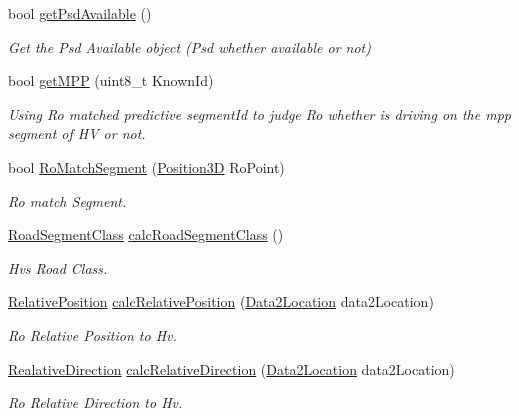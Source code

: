 \begin{DoxyCompactItemize}
bool \hyperlink{class_psd_location_aef776415f675a76e9b4c100534ba8ac5}{get\+Psd\+Available} ()
\begin{DoxyCompactList}\small\item\em Get the Psd Available object (Psd whether available or not) \end{DoxyCompactList}\item 
bool \hyperlink{class_psd_location_a07faf8dd338c17fb33e5978b90938c22}{get\+M\+PP} (uint8\+\_\+t Known\+Id)
\begin{DoxyCompactList}\small\item\em Using Ro matched predictive segment\+Id to judge Ro whether is driving on the mpp segment of HV or not. \end{DoxyCompactList}\item 
bool \hyperlink{class_psd_location_a8ff8c5e7cf8057f083f0a1d05fe49d56}{Ro\+Match\+Segment} (\hyperlink{_geometric_calc_8h_aabfa1dd0400b274a48b4a45afbee0af4}{Position3D} Ro\+Point)
\begin{DoxyCompactList}\small\item\em Ro match Segment. \end{DoxyCompactList}\item 
\hyperlink{_psd_message_decoder_8h_a4f9adeb93dfc3dac7961fa97e890b1a5}{Road\+Segment\+Class} \hyperlink{class_psd_location_a49111bfc564db23a9c64612d285ff4bc}{calc\+Road\+Segment\+Class} ()
\begin{DoxyCompactList}\small\item\em Hv\textquotesingle{}s Road Class. \end{DoxyCompactList}\item 
\hyperlink{_psd_location_8h_abcb85fd51379afdf750bdda1dec9174c}{Relative\+Position} \hyperlink{class_psd_location_a3b1402df4271f1470603a82a4fe03b68}{calc\+Relative\+Position} (\hyperlink{_psd_location_8h_a1e3a92020005d2a81aa50ba5ae9b129c}{Data2\+Location} data2\+Location)
\begin{DoxyCompactList}\small\item\em Ro Relative Position to Hv. \end{DoxyCompactList}\item 
\hyperlink{_psd_location_8h_ae65d9d286580719610837075ffad7232}{Realative\+Direction} \hyperlink{class_psd_location_afb451818c3fd9ff5e260270365bf165f}{calc\+Relative\+Direction} (\hyperlink{_psd_location_8h_a1e3a92020005d2a81aa50ba5ae9b129c}{Data2\+Location} data2\+Location)
\begin{DoxyCompactList}\small\item\em Ro Relative Direction to Hv. \end{DoxyCompactList}\item 

\end{DoxyCompactItemize}
